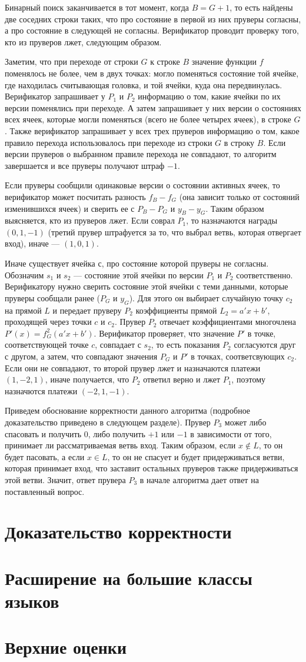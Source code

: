 \documentclass{mipt-thesis-bs}
\theoremstyle{plain}
\theoremstyle{definition}
\begin{document}
Бинарный поиск заканчивается в тот момент, когда $B = G + 1$, то есть найдены две соседних строки таких, что про состояние в первой из них пруверы согласны, а про состояние в следующей не согласны. Верификатор проводит проверку того, кто из пруверов лжет, следующим образом.

Заметим, что при переходе от строки $G$ к строке $B$ значение функции $f$ поменялось не более, чем в двух точках: могло поменяться состояние той ячейке, где находилась считывающая головка, и той ячейки, куда она передвинулась. Верификатор запрашивает у $P_1$ и $P_2$ информацию о том, какие ячейки по их версии поменялись при переходе. А затем запрашивает у них версии о состояниях всех ячеек, которые могли поменяться (всего не более четырех ячеек), в строке $G$. Также верификатор запрашивает у всех трех пруверов информацию о том, какое правило перехода использовалось при переходе из строки $G$ в строку $B$. Если версии пруверов о выбранном правиле перехода не совпадают, то алгоритм завершается и все пруверы получают штраф $-1$.

Если пруверы сообщили одинаковые версии о состоянии активных ячеек, то верификатор может посчитать разность $f_B - f_G$ (она зависит только от состояний изменившихся ячеек) и сверить ее с $P_B - P_G$ и $y_B - y_G$. Таким образом выясняется, кто из пруверов лжет. Если соврал $P_1$, то назначаются награды $(0, 1, -1)$ (третий прувер штрафуется за то, что выбрал ветвь, которая отвергает вход), иначе --- $(1, 0, 1)$.

Иначе существует ячейка $с$, про состояние которой пруверы не согласны. Обозначим $s_1$ и $s_2$ --- состояние этой ячейки по версии $P_1$ и $P_2$ соответственно. Верификатору нужно сверить состояние этой ячейки с теми данными, которые пруверы сообщали ранее ($P_G$ и $y_G$). Для этого он выбирает случайную точку $c_2$ на прямой $L$ и передает пруверу $P_2$ коэффициенты прямой $L_2 = a'x + b'$, проходящей через точки $c$ и $c_2$. Прувер $P_2$ отвечает коэффициентами многочлена $P'(x) = f^2_G(a'x + b')$. Верификатор проверяет, что значение $P'$ в точке, соответствующей точке $c$, совпадает с $s_2$, то есть показания $P_2$ согласуются друг с другом, а затем, что совпадают значения $P_G$ и $P'$ в точках, соответсвующих $c_2$. Если они не совпадают, то второй прувер лжет и назначаются платежи $(1, -2, 1)$, иначе получается, что $P_2$ ответил верно и лжет $P_1$, поэтому назначются платежи $(-2, 1, -1)$.

Приведем обоснование корректности данного алгоритма (подробное доказательство приведено в следующем разделе). Прувер $P_3$ может либо спасовать и получить 0, либо получить $+1$ или $-1$ в зависимости от того, принимает ли рассматриваемая ветвь вход. Таким образом, если $x \notin L$, то он будет пасовать, а если $x \in L$, то он не спасует и будет придерживаться ветви, которая принимает вход, что заставит остальных пруверов также придерживаться этой ветви. Значит, ответ прувера $P_3$ в начале алгоритма дает ответ на поставленный вопрос.

\section{Доказательство корректности}
\section{Расширение на большие классы языков}
\section{Верхние оценки}
\printbib
\end{document}
